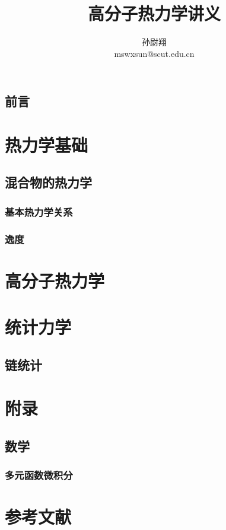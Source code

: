 \documentclass[zihao=-4,linespread=1.5,a4paper,heading=true,twoside]{ctexbook}
\title{高分子热力学讲义}
\author{孙尉翔\\mswxsun@scut.edu.cn}
\theoremstyle{definition}
\theoremstyle{plain}
\begin{document}
\chapter*{前言}\label{sec:preface}


\newpage\tableofcontents

\part{热力学基础}
\chapter{混合物的热力学}
\section{基本热力学关系}

\section{逸度}



\part{高分子热力学}
\part{统计力学}
\chapter{链统计}

\part{附录}
\chapter{数学}
\section{多元函数微积分}



\newpage\part*{参考文献}
\printbibliography[heading=none]
\end{document}
